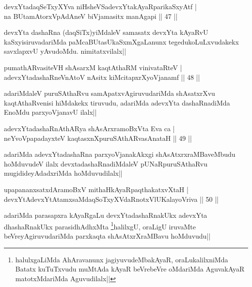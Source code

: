 \begin{shl}
devxYtadaqSeTxyXYva niHsheVSadevxYtakAyaRparikaSxyAtf |\\
na BUtamAtorxVpAdAneV biVjamasitx manAgapi \hfill || 47 ||
\end{shl}

\begin{artha}
devxYta dashaRna (daqSiTx)yiMdaleV samasatx devxYta kAyaRvU kaSxyisiruvadariMda paMcaBUtasUkaSxmXgaLanunx tegedukoLuLxvudakekx savxlapxvU yAvudoMdu. nimitatxvilalx||
\end{artha}

\begin{shl}
pumathARvasiteVH shAsarxM kaqtAthaRM vinivataRteV |\\
adevxYtadashaRneVnAtoV nAsitx kiMcitapxrXyoVjanamf \hfill || 48 ||
\end{shl}

\begin{artha}
adariMdaleV puruSAthaRvu samApatxvAgiruvudariMda shAsatxrXvu kaqtAthaRvenisi hiMdakekx tiruvudu, adariMda adevxYta dashaRnadiMda EnoMdu parxyoVjanavU ilalx||
\end{artha}

\begin{shl}
adevxYtadashaRnAthARya shAsArxramoBxV\s ta Eva ca |\\
neYvoVpapadayxteV kaqtasxnXpuruSAthARvasAnataH \hfill || 49 ||
\end{shl}

\begin{artha}
adariMda adevxYtadashaRna parxyoVjanakAkxgi shAsAtxrxraMBaveMbudu hoMduvudeV ilalx devxtadashaRnadiMdaleV pUNaRpuruSAthaRvu mugidideyAdadxriMda hoMduvudilalx||
\end{artha}

\begin{shl}
upapananxsatxdAramoBxV mithaHkAyaRpaqthakatxvXtaH |\\
devxYtAdevxYtAtamxsaMdaqSoTxyXVdaRnotxVlUKalayoVriva \hfill || 50 ||
\end{shl}

\begin{artha}
adariMda parasapxra kAyaRgaLu devxYtadashaRnakUkx adevxYta dhashaRnakUkx parasidhAdhxMta 
\footnote{halulxgaLiMda AhAravanunx jagiyuvudeMbakAyaR, oraLukalilxniMda Batatx kuTuTxvudu muMtAda kAyaR beVrebeVre oMdariMda AguvakAyaR matotxMdariMda Aguvudilalx||}halilxgU, oraLigU iruvaMte beVreyAgiruvudariMda parxkaqta shAsAtxrXraMBavu hoMduvudu||
\end{artha}

